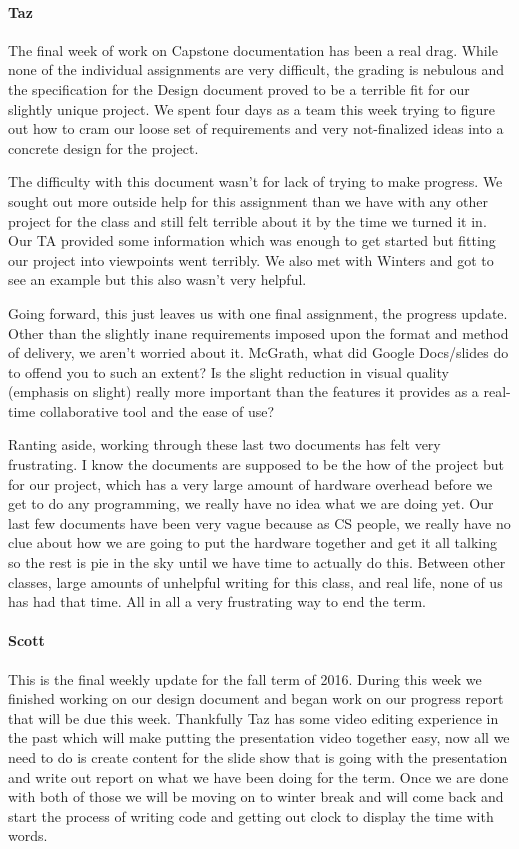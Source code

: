 \documentclass[onecolumn, draftclsnofoot,10pt, compsoc]{IEEEtran}
\begin{document}
\paragraph{Taz}
The final week of work on Capstone documentation has been a real drag. While none of the individual assignments are very difficult, the grading is nebulous and the specification for the Design document proved to be a terrible fit for our slightly unique project. We spent four days as a team this week trying to figure out how to cram our loose set of requirements and very not-finalized ideas into a concrete design for the project.

The difficulty with this document wasn't for lack of trying to make progress. We sought out more outside help for this assignment than we have with any other project for the class and still felt terrible about it by the time we turned it in. Our TA provided some information which was enough to get started but fitting our project into viewpoints went terribly. We also met with Winters and got to see an example but this also wasn't very helpful.

Going forward, this just leaves us with one final assignment, the progress update. Other than the slightly inane requirements imposed upon the format and method of delivery, we aren't worried about it. McGrath, what did Google Docs/slides do to offend you to such an extent? Is the slight reduction in visual quality (emphasis on slight) really more important than the features it provides as a real-time collaborative tool and the ease of use?

Ranting aside, working through these last two documents has felt very frustrating. I know the documents are supposed to be the how of the project but for our project, which has a very large amount of hardware overhead before we get to do any programming, we really have no idea what we are doing yet. Our last few documents have been very vague because as CS people, we really have no clue about how we are going to put the hardware together and get it all talking so the rest is pie in the sky until we have time to actually do this. Between other classes, large amounts of unhelpful writing for this class, and real life, none of us has had that time. All in all a very frustrating way to end the term.
\paragraph{Scott}
This is the final weekly update for the fall term of 2016. During this week we finished working on our design document and began work on our progress report that will be due this week. Thankfully Taz has some video editing experience in the past which will make putting the presentation video together easy, now all we need to do is create content for the slide show that is going with the presentation and write out report on what we have been doing for the term. Once we are done with both of those we will be moving on to winter break and will come back and start the process of writing code and getting out clock to display the time with words.
\end{document}
